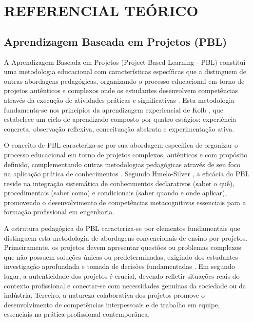 \documentclass[12pt,a4paper]{article}
\renewcommand{\cite}[1]{}
\begin{document}
\section{REFERENCIAL TEÓRICO}

\subsection{Aprendizagem Baseada em Projetos (PBL)}

A Aprendizagem Baseada em Projetos (Project-Based Learning - PBL) constitui uma
metodologia educacional com características específicas que a distinguem de
outras abordagens pedagógicas, organizando o processo educacional em torno de
projetos autênticos e complexos onde os estudantes desenvolvem competências
através da execução de atividades práticas e significativas \cite{thomas2000,
  savery2015}. Esta metodologia fundamenta-se nos princípios da aprendizagem
experiencial de Kolb \cite{kolb1984}, que estabelece um ciclo de aprendizado
composto por quatro estágios: experiência concreta, observação reflexiva,
conceituação abstrata e experimentação ativa.

O conceito de PBL caracteriza-se por sua abordagem específica de organizar o
processo educacional em torno de projetos complexos, autênticos e com propósito
definido, complementando outras metodologias pedagógicas através de seu foco na
aplicação prática de conhecimentos \cite{duch2001}. Segundo Hmelo-Silver
\cite{hmelo2004}, a eficácia do PBL reside na integração sistemática de
conhecimentos declarativos (saber o quê), procedimentais (saber como) e
condicionais (saber quando e onde aplicar), promovendo o desenvolvimento de
competências metacognitivas essenciais para a formação profissional em
engenharia.

A estrutura pedagógica do PBL caracteriza-se por elementos fundamentais que
distinguem esta metodologia de abordagens convencionais de ensino por projetos.
Primeiramente, os projetos devem apresentar questões ou problemas complexos que
não possuem soluções únicas ou predeterminadas, exigindo dos estudantes
investigação aprofundada e tomada de decisões fundamentadas \cite{savery2015}.
Em segundo lugar, a autenticidade dos projetos é crucial, devendo refletir
situações reais do contexto profissional e conectar-se com necessidades
genuínas da sociedade ou da indústria. Terceiro, a natureza colaborativa dos
projetos promove o desenvolvimento de competências interpessoais e de trabalho
em equipe, essenciais na prática profissional contemporânea.
\end{document}
